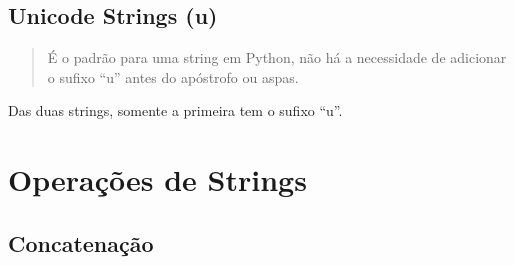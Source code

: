 \documentclass[letterpaper,10pt,brazil]{sphinxmanual}
\begin{document}
\subsection{Unicode Strings (u)}
\label{\detokenize{content/str:unicode-strings-u}}\begin{quote}

É o padrão para uma string em Python, não há a necessidade de adicionar o sufixo “u” antes do apóstrofo ou aspas.
\end{quote}

\begin{sphinxVerbatim}[commandchars=\\\{\}]
  
\end{sphinxVerbatim}

\begin{sphinxVerbatim}[commandchars=\\\{\}]
\end{sphinxVerbatim}

Das duas strings, somente a primeira tem o sufixo “u”.


\section{Operações de Strings}
\label{\detokenize{content/str:operacoes-de-strings}}

\subsection{Concatenação}
\label{\detokenize{content/str:concatenacao}}
\begin{sphinxVerbatim}[commandchars=\\\{\}]
    
\end{sphinxVerbatim}

\begin{sphinxVerbatim}[commandchars=\\\{\}]
\end{sphinxVerbatim}

\begin{sphinxVerbatim}[commandchars=\\\{\}]
  

\end{sphinxVerbatim}
\end{document}
